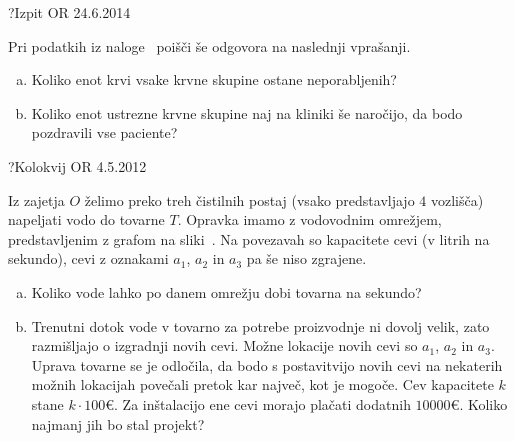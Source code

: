 \begin{naloga}{?}{Izpit OR 24.6.2014}
\begin{vprasanje}
Pri podatkih iz naloge~ poišči še odgovora na naslednji vprašanji.
\begin{enumerate}[(a)]
\item Koliko enot krvi vsake krvne skupine ostane neporabljenih?
\item Koliko enot ustrezne krvne skupine naj na kliniki še naročijo,
da bodo po\-zdra\-vi\-li vse paciente?
\end{enumerate}
\end{vprasanje}
\begin{odgovor}
\end{odgovor}
\end{naloga}


\begin{naloga}{?}{Kolokvij OR 4.5.2012}
\begin{vprasanje}[zajetje]
Iz zajetja $O$ želimo preko treh čistilnih postaj
(vsako predstavljajo $4$ vozlišča)
napeljati vodo do tovarne $T$.
Opravka imamo z vodovodnim omrežjem,
pred\-stav\-lje\-nim z grafom na sliki~\fig{}.
Na povezavah so kapacitete cevi (v litrih na sekundo),
cevi z oznakami $a_1$, $a_2$ in $a_3$ pa še niso zgrajene.

\begin{enumerate}[(a)]
\item Koliko vode lahko po danem omrežju dobi tovarna na sekundo?

\item Trenutni dotok vode v tovarno za potrebe proizvodnje ni dovolj velik,
zato razmišljajo o izgradnji novih cevi.
Možne lokacije novih cevi so $a_1$, $a_2$ in $a_3$.
Uprava tovarne se je odločila,
da bodo s postavitvijo novih cevi na nekaterih možnih lokacijah
povečali pretok kar največ, kot je mogoče.
Cev kapacitete $k$ stane $k \cdot 100 €$.
Za inštalacijo ene cevi morajo plačati dodatnih $10000 €$.
Koliko najmanj jih bo stal projekt?
\end{enumerate}

\begin{slika}
\makebox[\textwidth][c]{
\pgfslika
}
\end{slika}
\end{vprasanje}
\begin{odgovor}
\end{odgovor}
\end{naloga}


